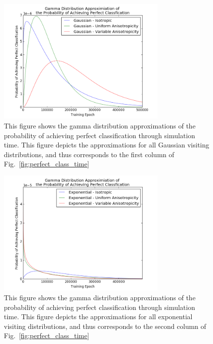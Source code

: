 \documentclass[11pt]{afthesis}
\begin{document}
	\begin{figure} 
		\includegraphics[width = 3.3in, trim={0.5cm 0 1.2cm 0.0cm},clip]{figures/gammaDists/gamma_g.png}
		\caption{This figure shows the gamma distribution approximations of the probability of achieving perfect classification through simulation time. This figure depicts the approximations for all Gaussian visiting distributions, and thus corresponds to the first column of Fig.~\ref{fig:perfect_class_time}}
		\label{fig:gaussian_gamma}
	\end{figure}
	
	\begin{figure} 
		\includegraphics[width = 3.3in, trim={0.5cm 0 1.2cm 0.0cm},clip]{figures/gammaDists/gamma_e.png}
		\caption{This figure shows the gamma distribution approximations of the probability of achieving perfect classification through simulation time. This figure depicts the approximations for all  exponential visiting distributions, and thus corresponds to the second column of Fig.~\ref{fig:perfect_class_time}}
		\label{fig:exp_gamma}
	\end{figure}
	
\end{document}
